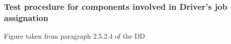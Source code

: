 \documentclass[a4paper,11pt]{report} %
\begin{document}
			\subsubsection{Test procedure for components involved in Driver's job assignation}
				\begin{minipage}{\linewidth}
				\end{minipage}
				\begin{center}
					Figure taken from paragraph 2.5.2.4 of the DD
				\end{center} 			
\end{document}
